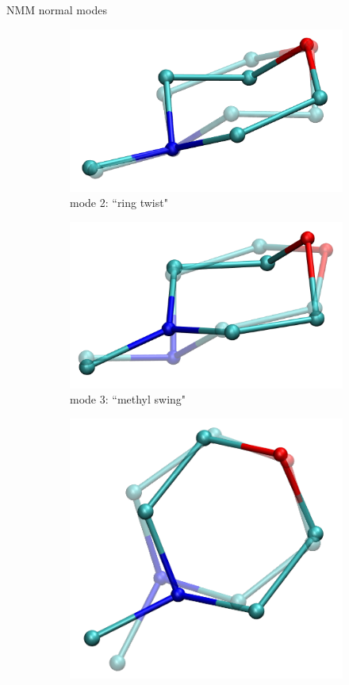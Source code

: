 \documentclass{beamer}
\begin{document}
\begin{frame}{NMM normal modes}
\begin{figure}
		\begin{subfigure}{\x\textwidth}
			\includegraphics[width=\textwidth]{mode2_ot.png}
			\caption{mode 2: ``ring twist"}
		\end{subfigure}	
		\begin{subfigure}{\x\textwidth}
			\includegraphics[width=\textwidth]{mode3_ot.png}
			\caption{mode 3: ``methyl swing"}
		\end{subfigure}
		\begin{subfigure}{\x\textwidth}
			\includegraphics[width=\textwidth]{mode4_ot.png}

\end{subfigure}
\end{figure}
\end{frame}
\end{document}
